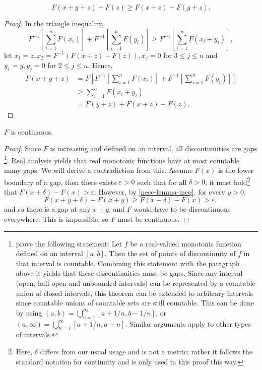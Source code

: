 \renewcommand\aa{x}
\newcommand\bb{y}
\newcommand\cc{z}

\begin{lem}\label{necc-lemma-ineq}
	$$F(\aa + \bb + \cc) + F(\cc) \geq F(\aa + \cc) + F(\bb + \cc).$$
\end{lem}

\begin{proof}
	In the triangle inequality,
	$$F^{-1} \left[ \sum_{i=1}^{n} F(\aa_i) \right] + F^{-1} \left[ \sum_{i=1}^{n} F(\bb_i) \right] \geq F^{-1} \left[ \sum_{i=1}^{n} F(\aa_i + \bb_i) \right],$$
	let $\aa_1 = \cc, \aa_2 = F^{-1}(F(\aa + \cc) - F(\cc)), \aa_j = 0$ for $3 \leq j \leq n$ and $\bb_1 = \bb, \bb_j = 0$ for $2 \leq j \leq n$. Hence,
	\begin{align*}
		F(\aa + \bb + \cc) & = F \left[ F^{-1} \left[ \sum_{i=1}^{n} F(\aa_i) \right] + F^{-1} \left[ \sum_{i=1}^{n} F(\bb_i) \right] \right] \\
		                   & \geq \sum_{i=1}^{n} F(\aa_i + \bb_i) \tag{by the triangle inequality}                                            \\
		                   & = F(\bb + \cc) + F(\aa + \cc) - F(\cc).
	\end{align*}
\end{proof}

\begin{lem}\label{lemma-continuity}
	$F$ is continuous.
\end{lem}

\begin{proof}
  Since $F$ is increasing and defined on an interval, all discontinuities are gaps \parencite[p. 335]{elementaryAna}\footnote{\parencite{elementaryAna} prove the following statement: Let $f$ be a real-valued monotonic function defined on an interval $[a, b]$. Then the set of points of discontinuity of $f$ in that interval is countable. Combining this statement with the paragraph above it yields that these discontinuities must be gaps. Since any interval (open, half-open and unbounded intervals) can be represented by a countable union of closed intervals, this theorem can be extended to arbitrary intervals since countable unions of countable sets are still countable. This can be done by using $(a,b) = \bigcup_{n=1}^{\infty}[a+1/n, b-1/n]$, or $(a, \infty) = \bigcup_{n=1}^{\infty}[a+1/n, a+n]$. Similar arguments apply to other types of intervals.}. Real analysis yields that real monotonic functions have at most countable many gaps. We will derive a contradiction from this.
	Assume $F(\aa)$ is the lower boundary of a gap, then there exists $\varepsilon > 0$ such that for all $\delta > 0$, it must hold\footnote{Here, $\delta$ differs from our usual usage and is not a metric; rather it follows the standard notation for continuity and is only used in this proof this way.} that $F(\aa + \delta) - F(\aa) > \varepsilon$. However, by \cref{necc-lemma-ineq}, for every $\bb > 0$,
	$$F(\aa + \bb + \delta) - F(\aa + \bb) \geq F(\aa + \delta) - F(\aa) > \varepsilon,$$
	and so there is a gap at any $\aa + \bb$, and $F$ would have to be discontinuous everywhere. This is impossible, so $F$ must be continuous.
\end{proof}

